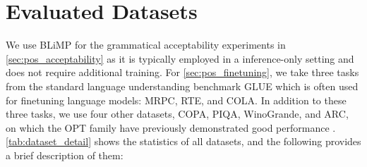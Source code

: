 \documentclass[letterpaper, 12pt]{report}
\begin{document}
% 

\section{Evaluated Datasets}
\label{sec:pos_evaluated_datasets}



We use BLiMP \citep{warstadt-etal-2020-blimp} for the grammatical acceptability experiments in \autoref{sec:pos_acceptability} as it is typically employed in a inference-only setting and does not require additional training. For \autoref{sec:pos_finetuning}, we take three tasks from the standard language understanding benchmark GLUE \citep{wang-etal-2018-glue} which is often used for finetuning language models: MRPC, RTE, and COLA. In addition to these three tasks, we use four other datasets, COPA, PIQA, WinoGrande, and ARC, on which the OPT family have previously demonstrated good performance \cite{Zhang2022:OPT}. \autoref{tab:dataset_detail} shows the statistics of all datasets, and the following provides a brief description of them:
\end{document}
